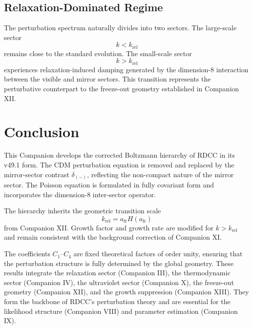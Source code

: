 \documentclass[11pt,a4paper]{article}
\begin{document}

\subsection{Relaxation-Dominated Regime}

The perturbation spectrum naturally divides into two sectors. The large-scale
sector
\begin{equation}
  k < k_{\mathrm{rel}}
\end{equation}
remains close to the standard evolution. The small-scale sector
\begin{equation}
  k > k_{\mathrm{rel}}
\end{equation}
experiences relaxation-induced damping generated by the dimension-8 interaction
between the visible and mirror sectors. This transition represents the
perturbative counterpart to the freeze-out geometry established in
Companion XII.


\section{Conclusion}

This Companion develops the corrected Boltzmann hierarchy of RDCC in its
v49.1 form. The CDM perturbation equation is removed and replaced by the
mirror-sector contrast \(\delta_{(-)}\), reflecting the non-compact nature of the
mirror sector. The Poisson equation is formulated in fully covariant form and
incorporates the dimension-8 inter-sector operator.

The hierarchy inherits the geometric transition scale
\begin{equation}
  k_{\mathrm{rel}} = a_{\mathrm{fr}} H(a_{\mathrm{fr}})
\end{equation}
from Companion XII. Growth factor and growth rate are modified for
\(k>k_{\mathrm{rel}}\) and remain consistent with the background correction
of Companion XI.

The coefficients \(C_1\)--\(C_4\) are fixed theoretical factors of order unity,
ensuring that the perturbation structure is fully determined by the global
geometry. These results integrate the relaxation sector (Companion III), the
thermodynamic sector (Companion IV), the ultraviolet sector (Companion X), the
freeze-out geometry (Companion XII), and the growth suppression
(Companion XIII). They form the backbone of RDCC's perturbation theory and are
essential for the likelihood structure (Companion VIII) and parameter
estimation (Companion IX).
\end{document}
